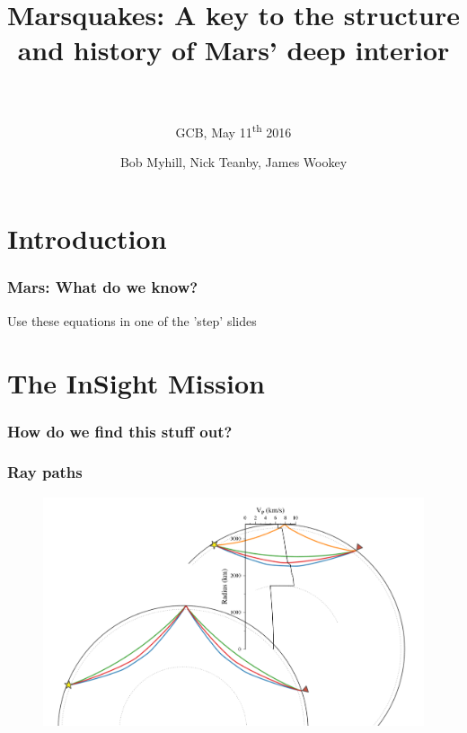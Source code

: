 \documentclass[compress,framenumber]{beamer}
\title{Marsquakes: A key to the structure and history of Mars' deep interior
\\$\,$}
\subtitle{GCB, May 11\textsuperscript{th} 2016}
\author{\hfill{Bob Myhill, Nick Teanby, James Wookey}}
\begin{document}
\begin{frame} 
\titlepage
\vspace{-1.0em}
\end{frame}


\section{Introduction}

\begin{frame}
  \frametitle{Mars: What do we know?}


Use these equations in one of the 'step' slides
\end{frame}




\section{The InSight Mission}

\begin{frame}
  \frametitle{How do we find this stuff out?}

\end{frame}

\begin{frame}
  \frametitle{Ray paths}
  \vspace{-4.0em}
  \begin{figure}
    \includegraphics[width=0.95\linewidth]{figures/ray_paths.pdf}
  \end{figure}
\end{frame}
\end{document}
